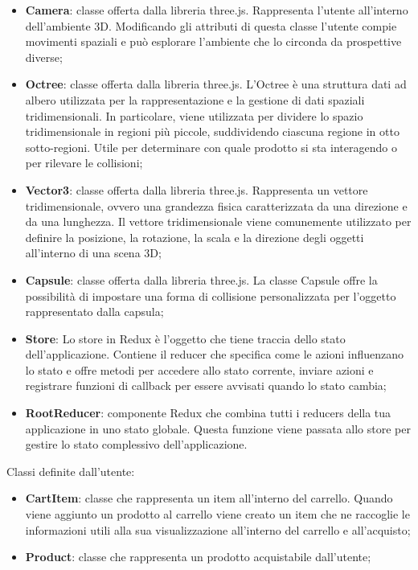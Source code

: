 \begin{itemize}
\begin{itemize}
			\item \textbf{Camera}: classe offerta dalla libreria three.js.
			Rappresenta l'utente all'interno dell'ambiente 3D.
			Modificando gli attributi di questa classe l'utente compie movimenti spaziali e può esplorare l'ambiente che 
			lo circonda da prospettive diverse;
			\item \textbf{Octree}: classe offerta dalla libreria three.js.
			L'Octree è una struttura dati ad albero utilizzata per la rappresentazione e la gestione di dati spaziali 
			tridimensionali. 
			In particolare, viene utilizzata per dividere lo spazio tridimensionale in regioni più piccole, 
			suddividendo ciascuna regione in otto sotto-regioni.
			Utile per determinare con quale prodotto si sta interagendo o per rilevare le collisioni;
			\item \textbf{Vector3}: classe offerta dalla libreria three.js.
			Rappresenta un vettore tridimensionale, ovvero una grandezza fisica caratterizzata da una direzione e da una lunghezza.
			Il vettore tridimensionale viene comunemente utilizzato per definire la posizione, la rotazione, 
			la scala e la direzione degli oggetti all'interno di una scena 3D;
			\item \textbf{Capsule}: classe offerta dalla libreria three.js.
			La classe Capsule offre la possibilità di impostare una forma di collisione personalizzata 
			per l'oggetto rappresentato dalla capsula; 
			\item \textbf{Store}: Lo store in Redux è l'oggetto che tiene traccia dello stato dell'applicazione. 
			Contiene il reducer che specifica come le azioni influenzano lo stato e offre metodi per accedere allo stato corrente, 
			inviare azioni e registrare funzioni di callback per essere avvisati quando lo stato cambia;
			\item \textbf{RootReducer}: componente Redux che combina tutti i reducers della tua applicazione in uno stato globale. 
			Questa funzione viene passata allo store per gestire lo stato complessivo dell'applicazione.
		\end{itemize}
		Classi definite dall'utente:
		\begin{itemize}
			\item \textbf{CartItem}: classe che rappresenta un item all'interno del carrello.
			Quando viene aggiunto un prodotto al carrello viene creato un item che ne raccoglie le informazioni utili 
			alla sua visualizzazione all'interno del carrello e all'acquisto;
			\item \textbf{Product}: classe che rappresenta un prodotto acquistabile dall'utente;

\end{itemize}
\end{itemize}
